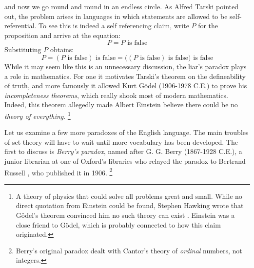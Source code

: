         {%
            \label{eqn:That_Statement_Is_False}%
        }
        and now we go round and round in an endless circle. As Alfred Tarski
        pointed out, the problem arises in languages in which statements are
        allowed to be self-referential. To see this is indeed a self
        referencing claim, write $P$ for the proposition and arrive at the
        equation:
        \begin{equation}
            P=P\text{ is false}
        \end{equation}
        Substituting $P$ obtains:
        \begin{equation}
            P=(P\text{ is false})\text{ is false}
             =\big((P\text{ is false})\text{ is false}\big)\text{ is false}
        \end{equation}
        While it may seem like this is an unnecessary discussion, the liar's
        paradox plays a role in mathematics. For one it motivates Tarski's
        theorem on the defineability of truth, and more famously it allowed Kurt
        G\"{o}del (1906-1978 C.E.) to prove his
        \textit{incompleteness theorems}, which really shook most of modern
        mathematics. Indeed, this theorem allegedly made Albert
        Einstein believe there could be no
        \textit{theory of everything}.%
        \footnote{%
            A theory of physics that could solve all problems great and small.
            While no direct quotation from Einstein could be found, Stephen
            Hawking wrote that G\"{o}del's theorem
            convinced him no such theory can exist \cite{Hawking2002Godel}.
            Einstein was a close friend to G\"{o}del, which is probably
            connected to how this claim originated.
        }
        \par\hfill\par
        Let us examine a few more paradoxes of the English language. The main
        troubles of set theory will have to wait until more vocabulary has been
        developed. The first to discuss is
        \textit{Berry's paradox},
        named after G. G. Berry (1867-1928 C.E.), a junior
        librarian at one of Oxford's libraries who relayed the paradox to
        Bertrand Russell
        \cite[p.~63]{CamCompBertRuss03}, who published it in 1906.%
        \footnote{%
            Berry's original paradox dealt with Cantor's theory of
            \textit{ordinal} numbers, not integers.
        }
